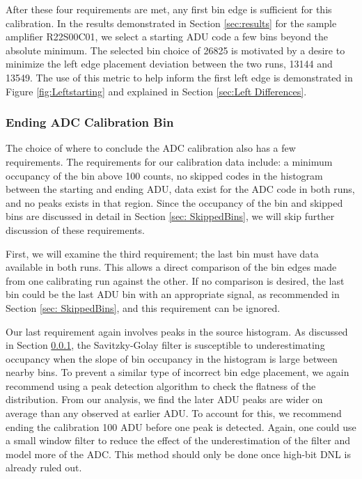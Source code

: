 \documentclass[linenumbers]{aastex7}
\begin{document}
After these four requirements are met, any first bin edge is sufficient for this calibration.  
In the results demonstrated in Section \ref{sec:results} for the sample amplifier R22S00C01, we select a starting ADU code a few bins beyond the absolute minimum. 
The selected bin choice of 26825 is motivated by a desire to minimize the left edge placement deviation between the two runs, 13144 and 13549.
The use of this metric to help inform the first left edge is demonstrated in Figure \ref{fig:Leftstarting} and explained in Section \ref{sec:Left Differences}.

\subsubsection{Ending ADC Calibration Bin}
\label{sec:Upperbound}

The choice of where to conclude the ADC calibration also has a few requirements. 
The requirements for our calibration data include: a minimum occupancy of the bin above 100 counts, no skipped codes in the histogram between the starting and ending ADU, data exist for the ADC code in both runs, and no peaks exists in that region.
Since the occupancy of the bin and skipped bins are discussed in detail in Section \ref{sec: SkippedBins}, we will skip further discussion of these requirements. 

First, we will examine the third requirement; the last bin must have data available in both runs.
This allows a direct comparison of the bin edges made from one calibrating run against the other. 
If no comparison is desired, the last bin could be the last ADU bin with an appropriate signal, as recommended in Section \ref{sec: SkippedBins}, and this requirement can be ignored.

Our last requirement again involves peaks in the source histogram. 
As discussed in Section \ref{sec:Upperbound}, the Savitzky-Golay filter is susceptible to underestimating occupancy when the slope of bin occupancy in the histogram is large between nearby bins. 
To prevent a similar type of incorrect bin edge placement, we again recommend using a peak detection algorithm to check the flatness of the distribution. 
From our analysis, we find the later ADU peaks are wider on average than any observed at earlier ADU.
To account for this, we recommend ending the calibration 100 ADU before one peak is detected.
Again, one could use a small window filter to reduce the effect of the underestimation of the filter and model more of the ADC.
This method should only be done once high-bit DNL is already ruled out. 
\end{document}
